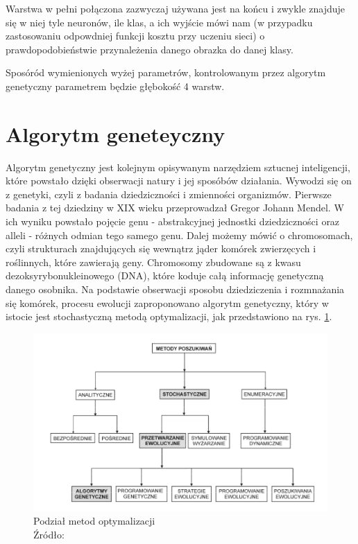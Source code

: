 Warstwa w pełni połączona zazwyczaj używana jest na końcu i zwykle znajduje się w niej tyle neuronów, ile klas, a ich wyjście mówi nam (w przypadku zastosowaniu odpowdniej funkcji kosztu przy uczeniu sieci) o prawdopodobieństwie przynależenia danego obrazka do danej klasy.

Sposóród wymienionych wyżej parametrów, kontrolowanym przez algorytm genetyczny parametrem będzie głębokość 4 warstw.

\section{Algorytm geneteyczny}\label{sec:ag}

Algorytm genetyczny jest kolejnym opisywanym narzędziem sztucnej inteligencji, które powstało dzięki obserwacji natury i jej sposóbów działania.
Wywodzi się on z genetyki, czyli z badania dziedziczności i zmienności organizmów.
Pierwsze badania z tej dziedziny w XIX wieku przeprowadzał Gregor Johann Mendel.
W ich wyniku powstało pojęcie genu - abstrakcyjnej jednostki dziedziczności oraz alleli - różnych odmian tego samego genu.
Dalej możemy mówić o chromosomach, czyli strukturach znajdujących się wewnątrz jąder komórek zwierzęcych i roślinnych, które zawierają geny.
Chromosomy zbudowane są z kwasu dezoksyrybonukleinowego (DNA), które koduje całą informację genetyczną danego osobnika.
Na podstawie obserwacji sposobu dziedziczenia i rozmnażania się komórek, procesu ewolucji zaproponowano algorytm genetyczny, który w istocie jest stochastyczną metodą optymalizacji, jak przedstawiono na rys. \ref{fig:klas_opt}.

\begin{figure}[h!tb]
	 \centering
	 \includegraphics[width = 0.8\linewidth]{img/optymalizacja}
	 \caption{Podział metod optymalizacji \\
              Źródło: \cite{bialaszewski2012}}
	 \label{fig:klas_opt}
\end{figure}

